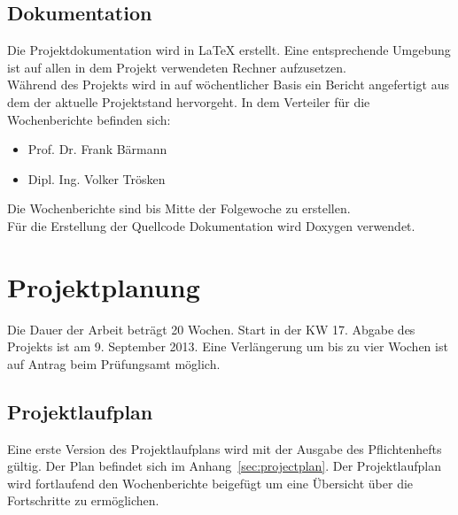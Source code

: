 \documentclass[a4paper,12pt,fleqn]{article}
\begin{document}
\subsection{Dokumentation}

Die Projektdokumentation wird in \LaTeX{} erstellt. Eine entsprechende Umgebung ist auf allen in dem Projekt verwendeten Rechner aufzusetzen.\\
Während des Projekts wird in auf wöchentlicher Basis ein Bericht angefertigt aus dem der aktuelle Projektstand hervorgeht. In dem Verteiler für die Wochenberichte befinden sich:
\begin{itemize}
\item Prof. Dr. Frank Bärmann
\item Dipl. Ing. Volker Trösken
\end{itemize}
Die Wochenberichte sind bis Mitte der Folgewoche zu erstellen.\\
Für die Erstellung der Quellcode Dokumentation wird Doxygen \cite{Dox1} verwendet. \\

\section{Projektplanung}
Die Dauer der Arbeit beträgt 20 Wochen. Start in der KW 17. Abgabe des Projekts ist am 9. September 2013. Eine Verlängerung um bis zu vier Wochen ist auf Antrag beim Prüfungsamt möglich.
\subsection{Projektlaufplan}
Eine erste Version des Projektlaufplans wird mit der Ausgabe des Pflichtenhefts gültig. Der Plan befindet sich im Anhang~\ref{sec:projectplan}. Der Projektlaufplan wird fortlaufend den Wochenberichte beigefügt um eine Übersicht über die Fortschritte zu ermöglichen.



\newpage


\end{document}
